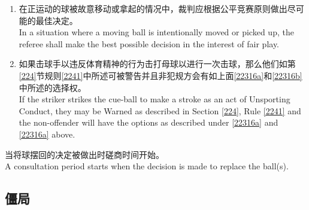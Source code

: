 \begin{enumerate}[label=(\alph*)]
\begin{enumerate}[label=(\roman*)]
        如果上面的情况发生在如第\ref{223}节规则\ref{22314}\ref{22314d}中所述的“犯规且\miss{}”的宣告序列中并且让违规者再次击打的要求被做出，那么任何涉及可能的判定此局他们的对方赢得的警告都应仍有效。\\
        If the above situation arises during a sequence of FOUL AND A MISS calls as described under Section \ref{223} Rule \ref{22314}\ref{22314d} and the request is made for the offender to play again, any Warning concerning the possible awarding of the frame to their opponent shall remain in effect.
    \end{enumerate}
    \item \label{22316b}在正运动的球被故意移动或拿起的情况中，裁判应根据公平竞赛原则做出尽可能的最佳决定。\\
    In a situation where a moving ball is intentionally moved or picked up, the referee shall make the best possible decision in the interest of fair play.
    \item 如果击球手以违反体育精神的行为击打母球以进行一次击球，那么他们如第\ref{224}节规则\ref{2241}中所述可被警告并且非犯规方会有如上面\ref{22316a}和\ref{22316b}中所述的选择权。\\
    If the striker strikes the cue-ball to make a stroke as an act of Unsporting Conduct, they may be Warned as described in Section \ref{224}, Rule \ref{2241} and the non-offender will have the options as described under \ref{22316a} and \ref{22316a} above.
\end{enumerate}
\noindent 当将球摆回的决定被做出时磋商时间开始。\\
A consultation period starts when the decision is made to replace the ball(s).

\subsection{僵局}\label{22317}

